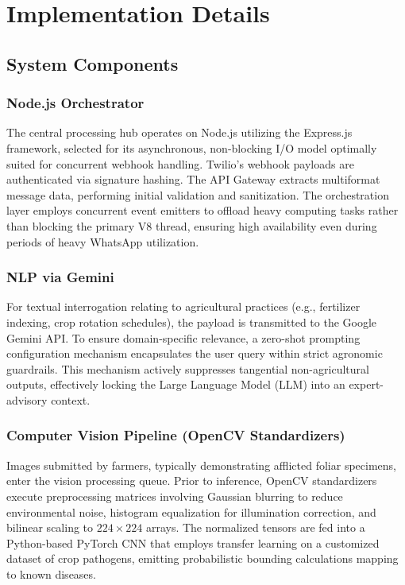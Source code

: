 \documentclass[12pt, a4paper]{report}
\begin{document}
\chapter{Implementation Details}

\section{System Components}

\subsection*{Node.js Orchestrator}
The central processing hub operates on Node.js utilizing the Express.js framework, selected for its asynchronous, non-blocking I/O model optimally suited for concurrent webhook handling. Twilio's webhook payloads are authenticated via signature hashing. The API Gateway extracts multiformat message data, performing initial validation and sanitization. The orchestration layer employs concurrent event emitters to offload heavy computing tasks rather than blocking the primary V8 thread, ensuring high availability even during periods of heavy WhatsApp utilization.

\subsection*{NLP via Gemini}
For textual interrogation relating to agricultural practices (e.g., fertilizer indexing, crop rotation schedules), the payload is transmitted to the Google Gemini API. To ensure domain-specific relevance, a zero-shot prompting configuration mechanism encapsulates the user query within strict agronomic guardrails. This mechanism actively suppresses tangential non-agricultural outputs, effectively locking the Large Language Model (LLM) into an expert-advisory context.

\subsection*{Computer Vision Pipeline (OpenCV Standardizers)}
Images submitted by farmers, typically demonstrating afflicted foliar specimens, enter the vision processing queue. Prior to inference, OpenCV standardizers execute preprocessing matrices involving Gaussian blurring to reduce environmental noise, histogram equalization for illumination correction, and bilinear scaling to $224 \times 224$ arrays. The normalized tensors are fed into a Python-based PyTorch CNN that employs transfer learning on a customized dataset of crop pathogens, emitting probabilistic bounding calculations mapping to known diseases.
\end{document}

